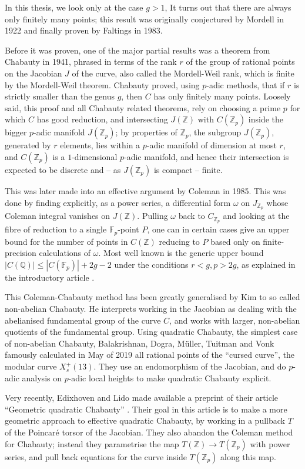 \documentclass[12pt]{article}
\newcommand{\Z}{\mathbb{Z}}
\newcommand{\Q}{\mathbb{Q}}
\newcommand{\F}{\mathbb{F}}
\theoremstyle{plain}
\theoremstyle{definition}
\theoremstyle{remark}
\begin{document}
In this thesis, we look only at the case $g > 1$, It turns out that there are always only finitely many points; this result was originally conjectured by Mordell in 1922 and finally proven by Faltings in 1983.

Before it was proven, one of the major partial results was a theorem from Chabauty in 1941, phrased in terms of the rank $r$ of the group of rational points on the Jacobian $J$ of the curve, also called the Mordell-Weil rank, which is finite by the Mordell-Weil theorem. Chabauty proved, using $p$-adic methods, that if $r$ is strictly smaller than the genus $g$, then $C$ has only finitely many points. Loosely said, this proof and all Chabauty related theorems, rely on choosing a prime $p$ for which $C$ has good reduction, and intersecting $J(\Z)$ with $C(\Z_p)$ inside the bigger $p$-adic manifold $J(\Z_p)$; by properties of $\Z_p$, the subgroup $J(\Z_p)$, generated by $r$ elements, lies within a $p$-adic manifold of dimension at most $r$, and $C(\Z_p)$ is a $1$-dimensional $p$-adic manifold, and hence their intersection is expected to be discrete and -- as $J(\Z_p)$ is compact -- finite.

This was later made into an effective argument by Coleman in 1985. This was done by finding explicitly, as a power series, a differential form $\omega$ on $J_{\Z_p}$ whose Coleman integral vanishes on $J(\Z)$. Pulling $\omega$ back to $C_{\Z_p}$ and looking at the fibre of reduction to a single $\F_p$-point $P$, one can in certain cases give an upper bound for the number of points in $C(\Z)$ reducing to $P$ based only on finite-precision calculations of $\omega$. Most well known is the generic upper bound $|C(\Q)| \leq |C(\F_p)| + 2g-2$ under the conditions $r < g, p > 2g$, as explained in the introductory article \citep{poonen12}.

This Coleman-Chabauty method has been greatly generalised by Kim to so called non-abelian Chabauty. He interprets working in the Jacobian as dealing with the abelianised fundamental group of the curve $C$, and works with larger, non-abelian quotients of the fundamental group. Using quadratic Chabauty, the simplest case of non-abelian Chabauty, Balakrishnan, Dogra, M\"uller, Tuitman and Vonk famously calculated in May of 2019 all rational points of the ``cursed curve'', the modular curve $X_s^+(13)$. They use an endomorphism of the Jacobian, and do $p$-adic analysis on $p$-adic local heights to make quadratic Chabauty explicit. 

Very recently, Edixhoven and Lido made available a preprint of their article ``Geometric quadratic Chabauty'' \citep{edixhoven20}. Their goal in this article is to make a more geometric approach to effective quadratic Chabauty, by working in a pullback $T$ of the Poincar\'e torsor of the Jacobian. They also abandon the Coleman method for Chabauty; instead they parametrise the map $T(\Z) \to T(\Z_p)$ with power series, and pull back equations for the curve inside $T(\Z_p)$ along this map. 
\end{document}
